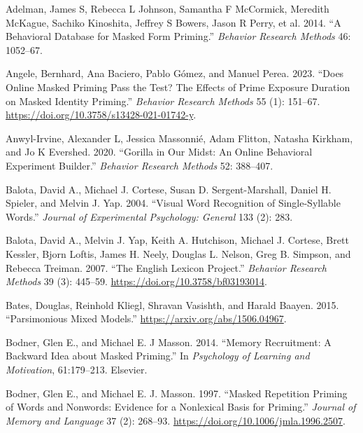 \documentclass[
]{interact}
\newlength{\cslhangindent}
\newenvironment{CSLReferences}[2] %
 {\begin{list}{}{%
  \setlength{\itemindent}{0pt}
  \setlength{\leftmargin}{0pt}
  \setlength{\parsep}{0pt}
  \ifodd #1
   \setlength{\leftmargin}{\cslhangindent}
   \setlength{\itemindent}{-1\cslhangindent}
  \fi
  \setlength{\itemsep}{#2\baselineskip}}}
 {\end{list}}
\begin{document}
\label{refs}
\begin{CSLReferences}{1}{0}
Adelman, James S, Rebecca L Johnson, Samantha F McCormick, Meredith
McKague, Sachiko Kinoshita, Jeffrey S Bowers, Jason R Perry, et al.
2014. {``A Behavioral Database for Masked Form Priming.''}
\emph{Behavior Research Methods} 46: 1052--67.

Angele, Bernhard, Ana Baciero, Pablo Gómez, and Manuel Perea. 2023.
{``Does Online Masked Priming Pass the Test? The Effects of Prime
Exposure Duration on Masked Identity Priming.''} \emph{Behavior Research
Methods} 55 (1): 151--67.
\url{https://doi.org/10.3758/s13428-021-01742-y}.

Anwyl-Irvine, Alexander L, Jessica Massonnié, Adam Flitton, Natasha
Kirkham, and Jo K Evershed. 2020. {``Gorilla in Our Midst: An Online
Behavioral Experiment Builder.''} \emph{Behavior Research Methods} 52:
388--407.

Balota, David A., Michael J. Cortese, Susan D. Sergent-Marshall, Daniel
H. Spieler, and Melvin J. Yap. 2004. {``Visual Word Recognition of
Single-Syllable Words.''} \emph{Journal of Experimental Psychology:
General} 133 (2): 283.

Balota, David A., Melvin J. Yap, Keith A. Hutchison, Michael J. Cortese,
Brett Kessler, Bjorn Loftis, James H. Neely, Douglas L. Nelson, Greg B.
Simpson, and Rebecca Treiman. 2007. {``The English Lexicon Project.''}
\emph{Behavior Research Methods} 39 (3): 445--59.
\url{https://doi.org/10.3758/bf03193014}.

Bates, Douglas, Reinhold Kliegl, Shravan Vasishth, and Harald Baayen.
2015. {``Parsimonious Mixed Models.''}
\url{https://arxiv.org/abs/1506.04967}.

Bodner, Glen E., and Michael E. J Masson. 2014. {``Memory Recruitment: A
Backward Idea about Masked Priming.''} In \emph{Psychology of Learning
and Motivation}, 61:179--213. Elsevier.

Bodner, Glen E., and Michael E. J. Masson. 1997. {``Masked Repetition
Priming of Words and Nonwords: Evidence for a Nonlexical Basis for
Priming.''} \emph{Journal of Memory and Language} 37 (2): 268--93.
\url{https://doi.org/10.1006/jmla.1996.2507}.


\end{CSLReferences}
\end{document}
